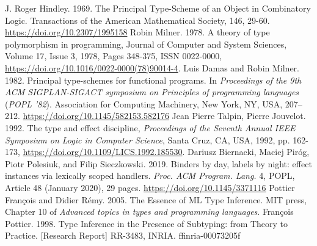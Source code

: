 \documentclass[declaration,shortabstract]{iithesis}
\theoremstyle{definition} \newtheorem{definition}{Definition}[section]
\begin{document}

\begin{thebibliography}{1}
    J. Roger Hindley. 1969. The Principal Type-Scheme of an Object in Combinatory Logic. Transactions of the American Mathematical Society, 146, 29-60. \url{https://doi.org/10.2307/1995158}
    Robin Milner. 1978.
    A theory of type polymorphism in programming,
    Journal of Computer and System Sciences,
    Volume 17, Issue 3,
    1978,
    Pages 348-375,
    ISSN 0022-0000,
     \url{https://doi.org/10.1016/0022-0000(78)90014-4}.
    Luis Damas and Robin Milner. 1982. Principal type-schemes for functional programs. In \textit{Proceedings of the 9th ACM SIGPLAN-SIGACT symposium on Principles of programming languages} (\textit{POPL '82}). Association for Computing Machinery, New York, NY, USA, 207–212. \url{https://doi.org/10.1145/582153.582176}
    Jean Pierre Talpin, Pierre Jouvelot. 1992. The type and effect discipline, \textit{Proceedings of the Seventh Annual IEEE Symposium on Logic in Computer Science}, Santa Cruz, CA, USA, 1992, pp. 162-173, \url{https://doi.org/10.1109/LICS.1992.185530}.
    Dariusz Biernacki, Maciej Piróg, Piotr Polesiuk, and Filip Sieczkowski. 2019. Binders by day, labels by night: effect instances via lexically scoped handlers. \textit{Proc. ACM Program. Lang.} 4, POPL, Article 48 (January 2020), 29 pages. \url{https://doi.org/10.1145/3371116}
    Pottier François and Didier Rémy. 2005.
    The Essence of ML Type Inference.
    MIT press, Chapter 10 of \textit{Advanced topics in types and programming languages}.
    François Pottier. 1998. Type Inference in the Presence of Subtyping: from Theory to Practice. [Research
    Report] RR-3483, INRIA. ffinria-00073205f
\end{thebibliography}
\end{document}
